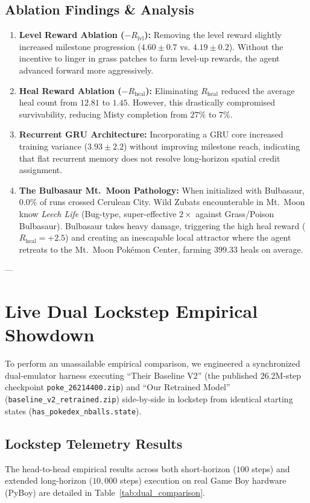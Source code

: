 \documentclass[conference]{IEEEtran}
\begin{document}
\subsection{Ablation Findings \& Analysis}
\begin{enumerate}
    \item \textbf{Level Reward Ablation ($-R_{\text{lvl}}$):} Removing the level reward slightly increased milestone progression ($4.60 \pm 0.7$ vs. $4.19 \pm 0.2$). Without the incentive to linger in grass patches to farm level-up rewards, the agent advanced forward more aggressively.
    \item \textbf{Heal Reward Ablation ($-R_{\text{heal}}$):} Eliminating $R_{\text{heal}}$ reduced the average heal count from $12.81$ to $1.45$. However, this drastically compromised survivability, reducing Misty completion from $27\%$ to $7\%$.
    \item \textbf{Recurrent GRU Architecture:} Incorporating a GRU core increased training variance ($3.93 \pm 2.2$) without improving milestone reach, indicating that flat recurrent memory does not resolve long-horizon spatial credit assignment.
    \item \textbf{The Bulbasaur Mt.~Moon Pathology:} When initialized with Bulbasaur, $0.0\%$ of runs crossed Cerulean City. Wild Zubats encounterable in Mt.~Moon know \textit{Leech Life} (Bug-type, super-effective $2\times$ against Grass/Poison Bulbasaur). Bulbasaur takes heavy damage, triggering the high heal reward ($R_{\text{heal}} = +2.5$) and creating an inescapable local attractor where the agent retreats to the Mt.~Moon Pok{\'e}mon Center, farming $399.33$ heals on average.
\end{enumerate}

---

\section{Live Dual Lockstep Empirical Showdown}

To perform an unassailable empirical comparison, we engineered a synchronized dual-emulator harness executing ``Their Baseline V2'' (the published 26.2M-step checkpoint \texttt{poke\_26214400.zip}) and ``Our Retrained Model'' (\texttt{baseline\_v2\_retrained.zip}) side-by-side in lockstep from identical starting states (\texttt{has\_pokedex\_nballs.state}).

\subsection{Lockstep Telemetry Results}
The head-to-head empirical results across both short-horizon ($100$ steps) and extended long-horizon ($10{,}000$ steps) execution on real Game Boy hardware (PyBoy) are detailed in Table~\ref{tab:dual_comparison}.
\end{document}
